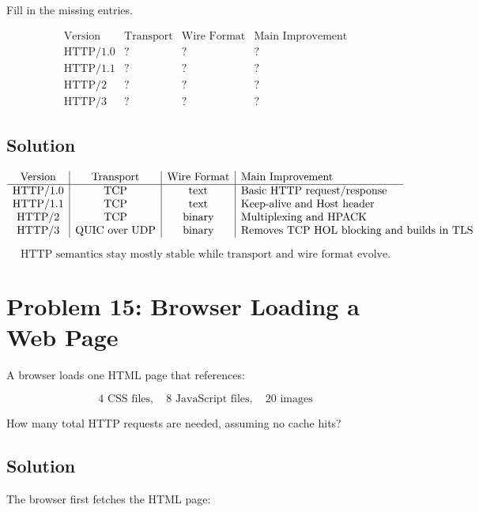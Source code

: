 \documentclass[12pt]{article}
\begin{document}
Fill in the missing entries.

\[
\begin{array}{c|c|c|c}
\text{Version} & \text{Transport} & \text{Wire Format} & \text{Main Improvement} \\
\hline
\text{HTTP/1.0} & ? & ? & ? \\
\text{HTTP/1.1} & ? & ? & ? \\
\text{HTTP/2} & ? & ? & ? \\
\text{HTTP/3} & ? & ? & ?
\end{array}
\]

\subsection*{Solution}

\[
\begin{array}{c|c|c|p{5cm}}
\text{Version} & \text{Transport} & \text{Wire Format} & \text{Main Improvement} \\
\hline
\text{HTTP/1.0} & \text{TCP} & \text{text} & \text{Basic HTTP request/response} \\
\text{HTTP/1.1} & \text{TCP} & \text{text} & \text{Keep-alive and Host header} \\
\text{HTTP/2} & \text{TCP} & \text{binary} & \text{Multiplexing and HPACK} \\
\text{HTTP/3} & \text{QUIC over UDP} & \text{binary} & \text{Removes TCP HOL blocking and builds in TLS}
\end{array}
\]

\[
\boxed{\text{HTTP semantics stay mostly stable while transport and wire format evolve.}}
\]

\section*{Problem 15: Browser Loading a Web Page}

A browser loads one HTML page that references:

\[
4 \text{ CSS files},\quad 8 \text{ JavaScript files},\quad 20 \text{ images}
\]

How many total HTTP requests are needed, assuming no cache hits?

\subsection*{Solution}

The browser first fetches the HTML page:
\end{document}
